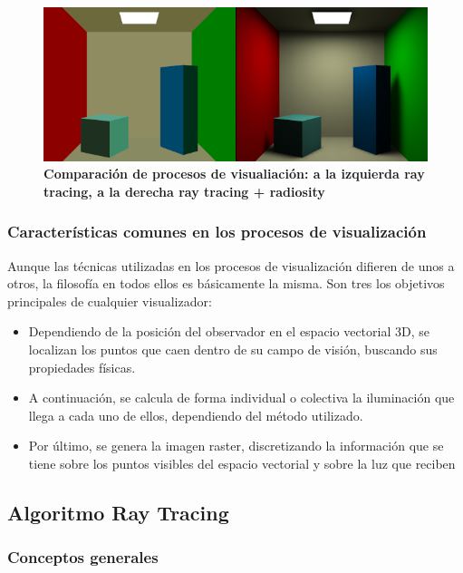 \begin{figure}[h]
\includegraphics[width=12cm]{Img/CPD/grafica7.png}
\centering
\caption{\textbf{\footnotesize{Comparación de procesos de visualiación: a la izquierda ray tracing, a la derecha ray tracing + radiosity}}}
\label{fig:grafica7}
\end{figure}

\clearpage
\subsubsection{Características comunes en los procesos de visualización}
Aunque las técnicas utilizadas en los procesos de visualización difieren de unos a otros, la filosofía en todos ellos es básicamente la misma. Son tres los objetivos principales de cualquier visualizador: 

\begin{itemize}
    \item Dependiendo de la posición del observador en el espacio vectorial 3D, se localizan los puntos que caen dentro de su campo de visión, buscando sus propiedades físicas.
    \item A continuación, se calcula de forma individual o colectiva la iluminación que llega a cada uno de ellos, dependiendo del método utilizado.
    \item Por último, se genera la imagen raster, discretizando la información que se tiene sobre los puntos visibles del espacio vectorial y sobre la luz que reciben

\end{itemize}



\subsection{Algoritmo Ray Tracing}

\subsubsection{Conceptos generales}
\label{section:ray-concept}

